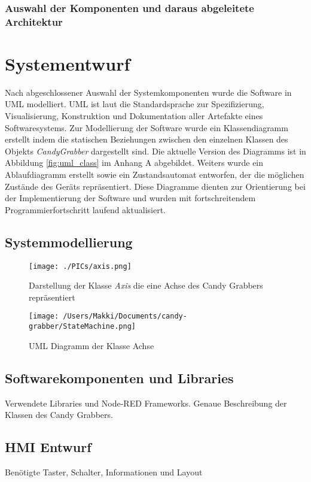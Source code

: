 \documentclass[BMR,Bachelor,ngerman]{twbook}%
\begin{document}
\subsubsection{Auswahl der Komponenten und daraus abgeleitete Architektur}
%
\clearpage
\section{Systementwurf}
Nach abgeschlossener Auswahl der Systemkomponenten wurde die Software in \ac{UML} modelliert. \ac{UML} ist laut  die Standardsprache zur Spezifizierung, Visualisierung, Konstruktion und Dokumentation aller Artefakte eines Softwaresystems. Zur Modellierung der Software wurde ein Klassendiagramm erstellt indem die statischen Beziehungen zwischen den einzelnen Klassen des Objekts \emph{CandyGrabber} dargestellt sind. Die aktuelle Version des Diagramms ist in Abbildung \ref{fig:uml_class} im Anhang A abgebildet. Weiters wurde ein Ablaufdiagramm erstellt sowie ein Zustandsautomat entworfen, der die möglichen Zustände des Geräts repräsentiert. Diese Diagramme dienten zur Orientierung bei der Implementierung der Software und wurden mit fortschreitendem Programmierfortschritt laufend aktualisiert. %
%
\subsection{Systemmodellierung}
%
\begin{figure}[!htbp]
\texttt{[image: ./PICs/axis.png]}
\caption{Darstellung der Klasse \emph{Axis} die eine Achse des Candy Grabbers repräsentiert}\label{fig:uml_axis}
\end{figure}
%
\begin{figure}[!htbp]
\centering
\texttt{[image: /Users/Makki/Documents/candy-grabber/StateMachine.png]}
\caption{\ac{UML} Diagramm der Klasse Achse}\label{fig:uml_state}
\end{figure}
%
\subsection{Softwarekomponenten und Libraries}
Verwendete Libraries und Node-RED Frameworks. Genaue Beschreibung der Klassen des Candy Grabbers.
%
\subsection{HMI Entwurf}
Benötigte Taster, Schalter, Informationen und Layout
\end{document}
